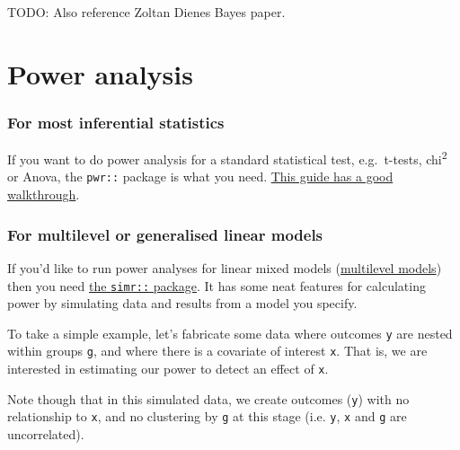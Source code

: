 \documentclass[]{article}
\begin{document}
TODO: Also reference Zoltan Dienes Bayes paper.

\hypertarget{power-analysis}{%
\section{Power analysis}\label{power-analysis}}

\hypertarget{for-most-inferential-statistics}{%
\subsubsection*{For most inferential statistics}\label{for-most-inferential-statistics}}

If you want to do power analysis for a standard statistical test, e.g.~t-tests,
chi\textsuperscript{2} or Anova, the \texttt{pwr::} package is what you need.
\href{http://www.statmethods.net/stats/power.html}{This guide has a good walkthrough}.

\hypertarget{for-multilevel-or-generalised-linear-models}{%
\subsubsection*{For multilevel or generalised linear models}\label{for-multilevel-or-generalised-linear-models}}

If you'd like to run power analyses for linear mixed models
(\protect\hyperlink{multilevel-models}{multilevel models}) then you need
\href{http://onlinelibrary.wiley.com/doi/10.1111/2041-210X.12504/full}{the \texttt{simr::} package}.
It has some neat features for calculating power by simulating data and results
from a model you specify.

To take a simple example, let's fabricate some data where outcomes \texttt{y} are
nested within groups \texttt{g}, and where there is a covariate of interest \texttt{x}. That
is, we are interested in estimating our power to detect an effect of \texttt{x}.

Note though that in this simulated data, we create outcomes (\texttt{y}) with no
relationship to \texttt{x}, and no clustering by \texttt{g} at this stage (i.e. \texttt{y}, \texttt{x} and
\texttt{g} are uncorrelated).
\end{document}
